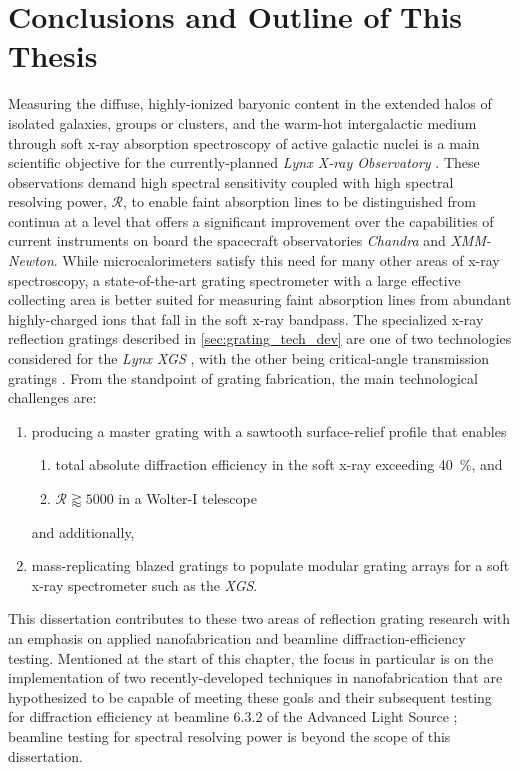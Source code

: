 \section{Conclusions and Outline of This Thesis}\label{sec:ch1_conclusions}
Measuring the diffuse, highly-ionized baryonic content in the extended halos of isolated galaxies, groups or clusters, and the warm-hot intergalactic medium through soft x-ray absorption spectroscopy of active galactic nuclei is a main scientific objective for the currently-planned \emph{Lynx X-ray Observatory} \cite[\emph{cf.\@} \cref{sec:astro_plasmas}]{Lynx_web,Gaskin19}. 
These observations demand high spectral sensitivity coupled with high spectral resolving power, $\mathscr{R}$, to enable faint absorption lines to be distinguished from continua at a level that offers a significant improvement over the capabilities of current instruments on board the spacecraft observatories \emph{Chandra} and \emph{XMM-Newton}. 
While microcalorimeters satisfy this need for many other areas of x-ray spectroscopy, a state-of-the-art grating spectrometer with a large effective collecting area is better suited for measuring faint absorption lines from abundant highly-charged ions that fall in the soft x-ray bandpass. 
The specialized x-ray reflection gratings described in \cref{sec:grating_tech_dev} are one of two technologies considered for the \emph{Lynx XGS} \cite{McEntaffer19}, with the other being critical-angle transmission gratings \cite{Heilmann11,Heilmann16,Gunther19}.
From the standpoint of grating fabrication, the main technological challenges are: 
\begin{enumerate}[noitemsep]
    \item producing a master grating with a sawtooth surface-relief profile that enables 
    \begin{enumerate}[noitemsep]
        \item total absolute diffraction efficiency in the soft x-ray exceeding \SI{40}{\percent}, and 
        \item $\mathscr{R} \gtrapprox 5000$ in a Wolter-I telescope
    \end{enumerate}
    and additionally,  
    \item mass-replicating blazed gratings to populate modular grating arrays for a soft x-ray spectrometer such as the \emph{XGS}. 
\end{enumerate}
This dissertation contributes to these two areas of reflection grating research with an emphasis on applied nanofabrication and beamline diffraction-efficiency testing. 
Mentioned at the start of this chapter, the focus in particular is on the implementation of two recently-developed techniques in nanofabrication that are hypothesized to be capable of meeting these goals and their subsequent testing for diffraction efficiency at beamline 6.3.2 of the Advanced Light Source \cite{ALS_web,ALS_632,Underwood96,Gullikson01}; beamline testing for spectral resolving power is beyond the scope of this dissertation. 

